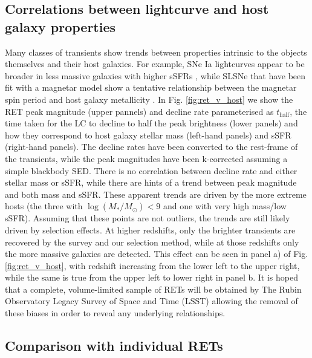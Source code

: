 \documentclass[fleqn,usenatbib,]{mnras}
\newcommand{\replychris}[1]{\color{magenta}#1 \color{black}}
\begin{document}
\subsection{Correlations between lightcurve and host galaxy properties \label{subsec:disc_correlations}}
Many classes of transients show trends between properties intrinsic to the objects themselves and their host galaxies. For example, SNe Ia lightcurves appear to be broader in less massive galaxies with higher sSFR\replychris{s} \citep{Sullivan2006,Neill2009,Howell2009,Sullivan2010,Roman2018,Kelsey2020}, while SLSNe that have been fit with a magnetar model show a tentative relationship between the magnetar spin period and host galaxy metallicity \citep{Chen2016a}. In Fig. \ref{fig:ret_v_host} we show the RET peak magnitude (upper pannels) and decline rate parameterised as $t_{\mathrm{half}}$, the time taken for the LC to decline to half the peak brightness (lower panels) and how they correspond to host galaxy stellar mass (left-hand panels) and sSFR (right-hand panels). The decline rates have been converted to the rest-frame of the transients, while the peak magnitudes have been k-corrected assuming a simple blackbody SED. There is no correlation between decline rate and either stellar mass or sSFR, while there are hints of a trend between peak magnitude and both mass and sSFR. These apparent trends are driven by the more extreme hosts (the three with $\log\left(M_*/M_{\odot}\right) < 9$ and one with very high mass/low sSFR). Assuming that these points are not outliers, the trends are still likely driven by selection effects. At higher redshifts, only the brighter transients are recovered by the survey and our selection method, while at those redshifts only the more massive galaxies are detected. This effect can be seen in panel a) of Fig. \ref{fig:ret_v_host}, with redshift increasing from the lower left to the upper right, while the same is true from the upper left to lower right in panel b. It is hoped that a complete, volume-limited sample of RETs will be obtained by The Rubin Observatory Legacy Survey of Space and Time (LSST) allowing the removal of these biases in order to reveal any underlying relationships.

\subsection{Comparison with individual RETs \label{subsec:disc_lowz}}
\end{document}
